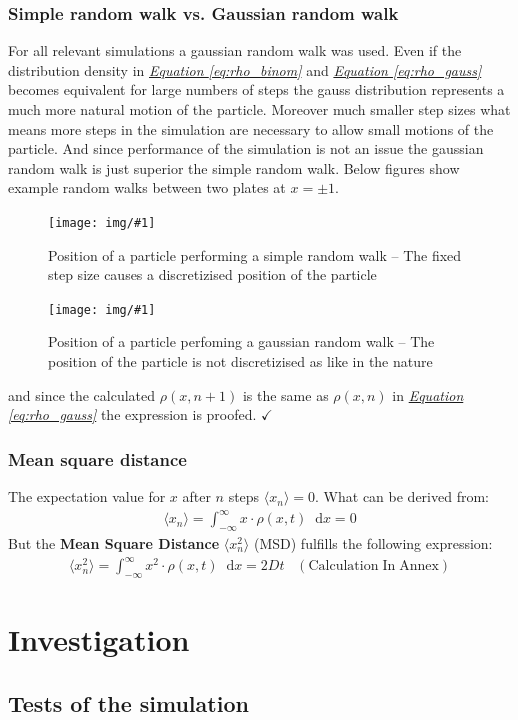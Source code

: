 \documentclass[a4paper, parskip=half]{scrartcl}
\newcommand{\effect}[1]{%
	\textbf{#1}%
}
\newcommand{\myImage}[2]{
	\begin{figure}[H]
	\centering
	\texttt{[image: img/\#1]}
	\caption{#2}
	\label{pic:#1}
	\end{figure}
}
\newcommand{\diff}{\mathop{}\!\mathrm{d}}
\newcommand{\myEqRef}[1]{\textit{\hyperref[eq:#1]{Equation \ref*{eq:#1}}}}
\newcommand{\myEqLabel}[1]{\label{eq:#1}}
\newcommand{\myEqAnnex}[1]{\;\;\;\mathrm{(Calculation\;In\;Annex)} \myEqLabel{#1}}
\begin{document}
\subsubsection{Simple random walk vs. Gaussian random walk}

For all relevant simulations a gaussian random walk was used. Even if the distribution density in \myEqRef{rho_binom} and \myEqRef{rho_gauss} becomes equivalent for large numbers of steps the gauss distribution represents a much more natural motion of the particle. Moreover much smaller step sizes what means more steps in the simulation are necessary to allow small motions of the particle. And since performance of the simulation is not an issue the gaussian random walk is just superior the simple random walk. Below figures show example random walks between two plates at $x = \pm 1$.

\myImage{fixed_pos}{Position of a particle performing a simple random walk -- The fixed step size causes a discretizised position of the particle}

\myImage{gauss_pos}{Position of a particle perfoming a gaussian random walk -- The position of the particle is not discretizised as like in the nature}

and since the calculated $\rho(x,n+1)$ is the same as $\rho(x,n)$ in \myEqRef{rho_gauss} the expression is proofed. $\checkmark$
\subsubsection{Mean square distance}
The expectation value for $x$ after $n$ steps $\langle x_n\rangle = 0$. What can be derived from:
\begin{align}
\langle x_n\rangle = \int_{-\infty}^\infty x \cdot \rho(x,t)\diff x = 0
\end{align}
But the \effect{Mean Square Distance} $\langle x_n^2\rangle$ (MSD) fulfills the following expression:
\begin{align}
\langle x_n^2\rangle = \int_{-\infty}^\infty x^2 \cdot \rho(x,t)\diff x = 2 D t \myEqAnnex{MSD}
\end{align}

\newpage
\section{Investigation}
\subsection{Tests of the simulation}
\end{document}
